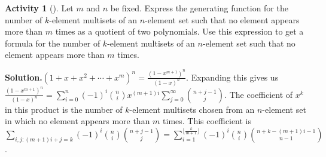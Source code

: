 \documentclass[10pt,]{book}
\theoremstyle{plain}
\theoremstyle{definition}
\newtheorem{activity}[project]{Activity}
\numberwithin{equation}{chapter}
\begin{document}
\begin{activity}[]\label{activity-202}
Let \(m\) and \(n\) be fixed. Express the generating function for the number of \(k\)-element multisets of an \(n\)-element set such that no element appears more than \(m\) times as a quotient of two polynomials. Use this expression to get a formula for the number of \(k\)-element multisets of an \(n\)-element set such that no element appears more than \(m\) times.%
\par\medskip\noindent%
\textbf{Solution.}\quad \((1+x+x^2+\cdots+x^m)^n=\frac{(1-x^{m+1})^n}{(1-x)^n}\).  Expanding this gives us \(\frac{(1-x^{m+1})^n}{(1-x)^n}=\sum_{i=0}^n(-1)^i \binom{n}{i}x^{(m+1)i} \sum_{j=0}^\infty \binom{n+j-1}{j}\). The coefficient of \(x^k\) in this product is the number of \(k\)-element multisets chosen from an \(n\)-element set in which no element appears more than \(m\) times. This coefficient is \(\sum\limits_{i,j:(m+1)i+j=k}(-1)^i\binom{n}{i}\binom{n+j-1}{j}=\sum\limits_{i=1}^{\lfloor\frac{k}{m+1}\rfloor}(-1)^i\binom{n}{i}\binom{n+k-(m+1)i-1}{n-1}\).%
\end{activity}
\end{document}
